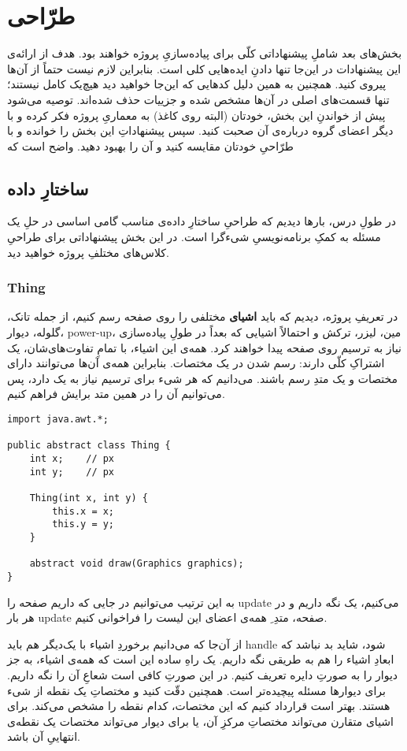 \documentclass[a4paper,12pt]{paper}
\newcommand{\minti}[1]{\roundbox{\lr{\texttt{#1}}}}
\begin{document}
\section{طرّاحی}
بخش‌های بعد شاملِ پیشنهاداتی کلّی برای پیاده‌سازیِ پروژه خواهند بود. هدف از ارائه‌ی این پیشنهادات در این‌جا تنها دادنِ ایده‌هایی کلی است. بنابراین لازم نیست حتماً از آن‌ها پیروی کنید. همچنین به همین دلیل کدهایی که این‌جا خواهید دید هیچ‌یک کامل نیستند؛ تنها قسمت‌های اصلی در آن‌ها مشخص شده و جزييات حذف شده‌اند. توصیه می‌شود پیش از خواندنِ این بخش، خودتان (البته روی کاغذ) به معماریِ پروژه فکر کرده و با دیگر اعضای گروه درباره‌ی آن صحبت کنید. سپس پیشنهاداتِ این بخش را خوانده و با طرّاحیِ خودتان مقایسه کنید و آن را بهبود دهید. واضح است که 
\subsection{ساختارِ داده}
در طولِ درس، بارها دیدیم که طراحیِ ساختارِ داده‌ی مناسب گامی اساسی در حلِ یک مسئله به کمکِ برنامه‌نویسیِ شیء‌گرا است. در این بخش پیشنهاداتی برای طراحیِ کلاس‌های مختلفِ پروژه خواهید دید.
\subsubsection{\en Thing}
در تعریفِ پروژه، دیدیم که باید \textbf{اشیای} مختلفی را روی صفحه رسم کنیم، از جمله تانک، گلوله، دیوار، {\en power-up}، مین، لیزر، ترکش و احتمالاً اشیایی که بعداً در طولِ پیاده‌سازی نیاز به ترسیم روی صفحه پیدا خواهند کرد. همه‌ی این اشیاء، با تمامِ تفاوت‌های‌شان، یک اشتراکِ کلّی دارند: رسم شدن در یک مختصات. بنابراین همه‌ی آن‌ها می‌توانند دارای مختصات و یک متدِ رسم باشند. می‌دانیم که هر شیء برای ترسیم نیاز به یک \minti{Graphics} دارد، پس می‌توانیم آن را در همین متد برایش فراهم کنیم.
\begin{verbatim}
import java.awt.*;

public abstract class Thing {
	int x;    // px
	int y;    // px

	Thing(int x, int y) {
		this.x = x;
		this.y = y;
	}

	abstract void draw(Graphics graphics);
}
\end{verbatim}
به این ترتیب می‌توانیم در جایی که داریم صفحه را {\en update} می‌کنیم، یک \minti{List<Thing>} نگه داریم و در هر بار {\en update}ِ صفحه، متدِ \minti{.draw}ِ همه‌ی اعضای این لیست را فراخوانی کنیم.

\begin{sugg}
از آن‌جا که می‌دانیم برخوردِ اشیاء با یک‌دیگر هم باید {\en handle} شود، شاید بد نباشد که ابعادِ اشیاء را هم به طریقی نگه داریم.
یک راهِ ساده این است که همه‌ی اشیاء، به جز دیوار را به صورتِ دایره تعریف کنیم. در این صورتِ کافی است شعاعِ آن را نگه داریم. برای دیوارها مسئله پیچیده‌تر است.
همچنین دقّت کنید \minti{.x} و \minti{.y} مختصاتِ یک نقطه از شیء هستند. بهتر است قرارداد کنیم که این مختصات، کدام نقطه را مشخص می‌کند. برای اشیای متقارن می‌تواند مختصاتِ مرکزِ آن، یا برای دیوار می‌تواند مختصات یک نقطه‌ی انتهاییِ آن باشد.
\end{sugg}
\end{document}

